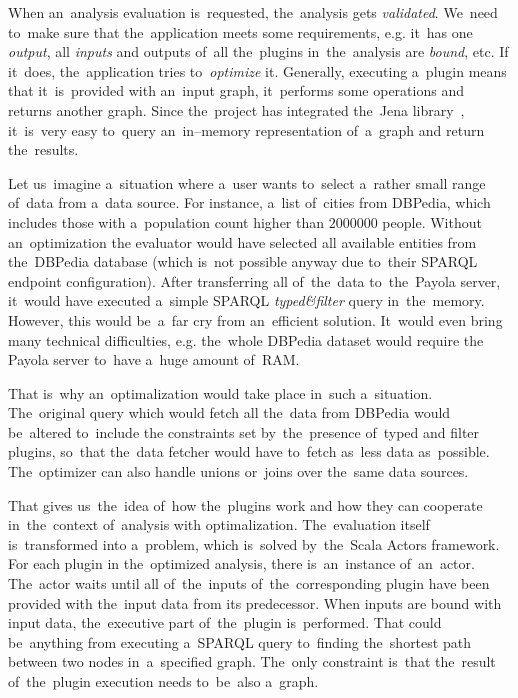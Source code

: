 When an~analysis evaluation is~requested, the~analysis gets \emph{validated}. We~need to~make
sure that the~application meets some requirements, e.g. it~has one 
\emph{output}, all \emph{inputs} and outputs of~all the~plugins in~the~analysis are \emph{bound}, etc.
If it~does, the~application tries to~\emph{optimize} it. Generally, executing a~plugin 
means that it~is~provided with an~input graph, it~performs some operations and 
returns another graph. Since the~project has integrated the~Jena library~\cite{jena}, it~is~very easy to~query an~in--memory representation of~a~graph and return the~results.

Let us~imagine a~situation where a~user wants to~select a~rather small range of~data from a~data source. For instance, a~list of~cities from DBPedia, which includes those
with a~population count higher than $2000000$ people. Without an~optimization
the evaluator would have selected all available entities from the~DBPedia 
database (which is~not possible anyway due to~their SPARQL endpoint 
configuration). After transferring all of~the~data to~the~Payola server, it~would have
executed a~simple SPARQL \emph{typed\&filter} query in~the~memory.
However, this would be~a~far cry from an~efficient solution. It~would even
bring many technical difficulties, e.g. the~whole DBPedia dataset would require 
the Payola server to~have a~huge amount of~RAM.

That is~why an~optimalization would take place in~such a~situation. The~original 
query which would fetch all the~data from DBPedia would be~altered to~include 
the constraints set by~the~presence of~typed and filter plugins, so~that the~data fetcher would have to~fetch as~less data as~possible. The~optimizer can 
also handle unions or~joins over the~same data sources.

That gives us~the~idea of~how the~plugins work and how they can cooperate in~the~context of~analysis with optimalization. The~evaluation itself is~transformed 
into a~problem, which is~solved by~the~Scala Actors framework. For each plugin 
in the~optimized analysis, there is~an~instance of~an~actor. The~actor waits 
until all of~the~inputs of~the~corresponding plugin have been provided with the~input data from its predecessor. When inputs are bound with input data, the~executive part of~the~plugin is~performed. That could be~anything from 
executing a~SPARQL query to~finding the~shortest path between two nodes in~a~specified graph. The~only constraint is~that the~result of~the~plugin execution 
needs to~be~also a~graph.

